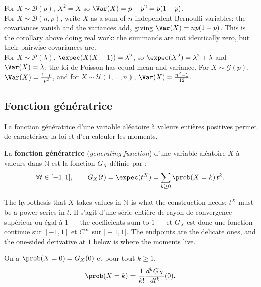 \begin{example}
  For $X \sim \mathcal{B}(p)$, $X^{2} = X$ so
  $\Var(X) = p - p^{2} = p(1-p)$.\\

  For $X \sim \mathcal{B}(n,p)$, write $X$ as a sum of $n$ independent Bernoulli
  variables; the covariances vanish and the variances add, giving
  $\Var(X) = np(1-p)$. This is the corollary above doing real work: the
  summands are not identically zero, but their pairwise covariances are.\\

  For $X \sim \mathcal{P}(\lambda)$, $\expec(X(X-1)) = \lambda^{2}$, so
  $\expec(X^{2}) = \lambda^{2} + \lambda$ and $\Var(X) = \lambda$: the loi de
  Poisson has equal mean and variance. For $X \sim \mathcal{G}(p)$,
  $\Var(X) = \frac{1-p}{p^{2}}$, and for $X \sim \mathcal{U}(1,\dots,n)$,
  $\Var(X) = \frac{n^{2}-1}{12}$.
\end{example}

\subsection{Fonction génératrice}

La fonction génératrice d'une variable aléatoire à valeurs entières positives
permet de caractériser la loi et d'en calculer les moments.

\begin{definition}
  La \textbf{fonction génératrice} (\textit{generating function}) d'une variable
  aléatoire $X$ à valeurs dans $\mathbb{N}$ est la fonction $G_{X}$ définie
  par :
  \[ \forall t \in [-1,1], \qquad
     G_{X}(t) = \expec(t^{X}) = \sum_{k \ge 0} \prob(X = k)\, t^{k}. \]
\end{definition}

The hypothesis that $X$ takes values in $\mathbb{N}$ is what the construction
needs: $t^{X}$ must be a power series in $t$. Il s'agit d'une série entière de
rayon de convergence supérieur ou égal à $1$ --- the coefficients sum to $1$ ---
et $G_{X}$ est donc une fonction continue sur $[-1,1]$ et $C^{\infty}$ sur
$]-1,1[$. The endpoints are the delicate ones, and the one-sided derivative at
$1$ below is where the moments live.

\begin{prop}
  On a $\prob(X = 0) = G_{X}(0)$ et pour tout $k \ge 1$,
  \[ \prob(X = k) = \frac{1}{k!} \frac{d^{k} G_{X}}{dt^{k}}(0). \]
\end{prop}

